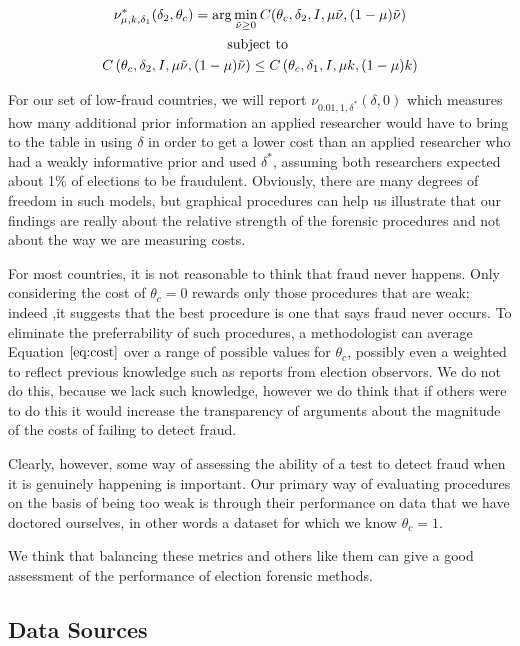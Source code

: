 \begin{gather}
\nu_{\mu,k,\delta_1}^*(\delta_2,\theta_c) = \arg \min_{\tilde{\nu} \ge 0} C(\theta_c,\delta_2,I,\mu \tilde{\nu},(1-\mu)\tilde{\nu})  \\
\textrm{subject to } \notag \\
C \left(\theta_c,\delta_2,I,\mu \tilde{\nu},(1-\mu)\tilde{\nu} \right) \le  C \left(\theta_c,\delta_1,I,\mu k,(1-\mu)k \right) \notag
\end{gather} 

For our set of low-fraud countries, we will report $\nu_{0.01,1,\delta^*} (\delta,0)$ which measures how many additional prior information an applied researcher would have to bring to the table in using $\delta$ in order to get a lower cost than an applied researcher who had a weakly informative prior and used $\delta^*$, assuming both researchers expected about 1\% of elections to be fraudulent. Obviously, there are many degrees of freedom in such models, but graphical procedures can help us illustrate that our findings are really about the relative strength of the forensic procedures and not about the way we are measuring costs. 

For most countries, it is not reasonable to think that fraud never happens. Only considering the cost of $\theta_c=0$ rewards only those procedures that are weak; indeed ,it suggests that the best procedure is one that says fraud never occurs. To eliminate the preferrability of such procedures, a methodologist can average Equation $\ref{eq:cost}$ over a range of possible values for $\theta_c$, possibly even a weighted to reflect previous knowledge such as reports from election observors. We do not do this, because we lack such knowledge, however we do think that if others were to do this it would increase the transparency of arguments about the magnitude of the costs of failing to detect fraud. 

Clearly, however, some way of assessing the ability of a test to detect fraud when it is genuinely happening is important. Our primary way of evaluating procedures on the basis of being too weak is through their performance on data that we have doctored ourselves, in other words a dataset for which we know $\theta_c=1$.

We think that balancing these metrics and others like them can give a good assessment of the performance of election forensic methods.  
\subsection{Data Sources}



